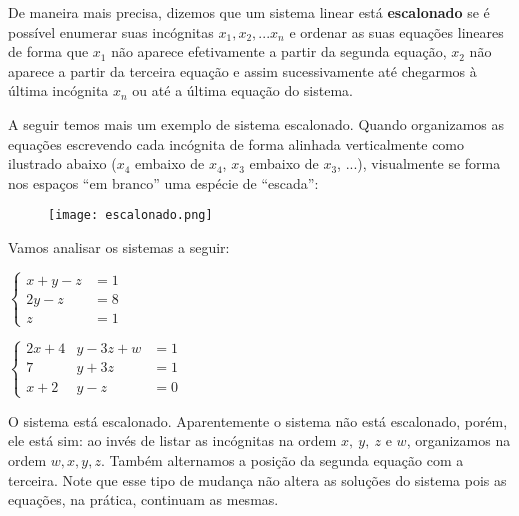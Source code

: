 	De maneira mais precisa, dizemos que um sistema linear está \textbf{escalonado} se é possível enumerar suas incógnitas $x_1,x_2,...x_n$ e ordenar as suas equações lineares de forma que $x_1$ não aparece efetivamente a partir da segunda equação, $x_2$ não aparece a partir da terceira equação e assim sucessivamente até chegarmos à última incógnita $x_n$ ou até a última equação do sistema.
	
	A seguir temos mais um exemplo de sistema escalonado. Quando organizamos as equações escrevendo cada incógnita de forma alinhada verticalmente como ilustrado abaixo ($x_4$ embaixo de $x_4$, $x_3$ embaixo de $x_3$, ...), visualmente se forma nos espaços “em branco”{} uma espécie de “escada”:

\begin{figure}[H]
\centering

\noindent\texttt{[image: escalonado.png]}
\end{figure}

Vamos analisar os sistemas a seguir:

\begin{enumerate}[label=\titem{(\Roman*)}]

\begin{minipage}{.45\linewidth}
\centering
\item 
$
\left\{
\begin{aligned}
x+y-z&=1\\
2y-z&=8\\
z&=1
\end{aligned}
\right.
$
\end{minipage}
\begin{minipage}{.45\linewidth}
\centering
\item 
$
\left \{
\begin{aligned}
2x+4&y-3z+w&=1\\
7&y+3z&=1\\
x+2&y-z&=0
\end{aligned}
\right.
$
\end{minipage}
\end{enumerate}






O sistema  está escalonado. Aparentemente o sistema  não está escalonado, porém, ele está sim: ao invés de listar as incógnitas na ordem $x, \ y, \ z$ e $w$, organizamos na ordem $w, x, y, z$. Também alternamos a posição da segunda equação com a terceira. Note que esse tipo de mudança não altera as soluções do sistema pois as equações, na prática, continuam as mesmas.

